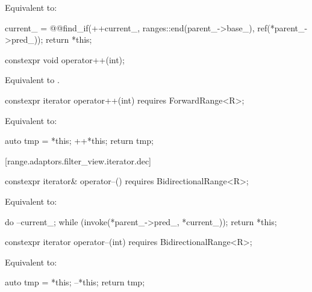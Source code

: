 \begin{itemdescr}
\pnum
\effects Equivalent to:
\begin{codeblock}
current_ = @@find_if(++current_, ranges::end(parent_->base_), ref(*parent_->pred_));
return *this;
\end{codeblock}
\end{itemdescr}

%
\begin{itemdecl}
constexpr void operator++(int);
\end{itemdecl}

\begin{itemdescr}
\pnum
\effects Equivalent to .
\end{itemdescr}

%
\begin{itemdecl}
constexpr iterator operator++(int) requires ForwardRange<R>;
\end{itemdecl}

\begin{itemdescr}
\pnum
\effects Equivalent to:
\begin{codeblock}
auto tmp = *this;
++*this;
return tmp;
\end{codeblock}
\end{itemdescr}

[range.adaptors.filter_view.iterator.dec]{}

%
\begin{itemdecl}
constexpr iterator& operator--() requires BidirectionalRange<R>;
\end{itemdecl}

\begin{itemdescr}
\pnum
\effects Equivalent to:
\begin{codeblock}
do
  --current_;
while (invoke(*parent_->pred_, *current_));
return *this;
\end{codeblock}
\end{itemdescr}

%
\begin{itemdecl}
constexpr iterator operator--(int) requires BidirectionalRange<R>;
\end{itemdecl}

\begin{itemdescr}
\pnum
\effects Equivalent to:
\begin{codeblock}
auto tmp = *this;
--*this;
return tmp;
\end{codeblock}
\end{itemdescr}

